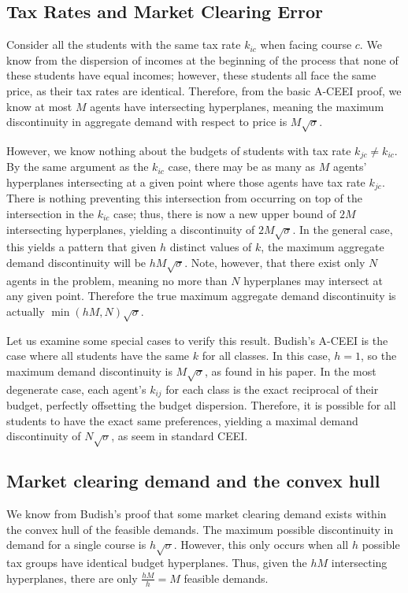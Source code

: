 \documentclass{article}
\begin{document}
\subsection{Tax Rates and Market Clearing Error}

Consider all the students with the same tax rate $k_{ic}$ when facing course $c$. We know from the dispersion of incomes at the beginning of the process that none of these students have equal incomes; however, these students all face the same price, as their tax rates are identical. Therefore, from the basic A-CEEI proof, we know at most $M$ agents have intersecting hyperplanes, meaning the maximum discontinuity in aggregate demand with respect to price is $M\sqrt{\sigma}$. 

However, we know nothing about the budgets of students with tax rate $k_{jc} \neq k_{ic}$. By the same argument as the $k_{ic}$ case, there may be as many as $M$ agents' hyperplanes intersecting at a given point where those agents have tax rate $k_{jc}$. There is nothing preventing this intersection from occurring on top of the intersection in the $k_{ic}$ case; thus, there is now a new upper bound of $2M$ intersecting hyperplanes, yielding a discontinuity of $2M\sqrt{\sigma}$. In the general case, this yields a pattern that given $h$ distinct values of $k$, the maximum aggregate demand discontinuity will be $hM\sqrt{\sigma}$. Note, however, that there exist only $N$ agents in the problem, meaning no more than $N$ hyperplanes may intersect at any given point. Therefore the true maximum aggregate demand discontinuity is actually $\min(hM, N)\sqrt{\sigma}$.

Let us examine some special cases to verify this result. Budish's A-CEEI is the case where all students have the same $k$ for all classes. In this case, $h = 1$, so the maximum demand discontinuity is $M\sqrt{\sigma}$, as found in his paper. In the most degenerate case, each agent's $k_{ij}$ for each class is the exact reciprocal of their budget, perfectly offsetting the budget dispersion. Therefore, it is possible for all students to have the exact same preferences, yielding a maximal demand discontinuity of $N\sqrt{\sigma}$, as seem in standard CEEI. 

\subsection{Market clearing demand and the convex hull}

We know from Budish's proof that some market clearing demand exists within the convex hull of the feasible demands. The maximum possible discontinuity in demand for a single course is $h\sqrt{\sigma}$. However, this only occurs when all $h$ possible tax groups have identical budget hyperplanes. Thus, given the $hM$ intersecting hyperplanes, there are only $\frac{hM}{h} = M$ feasible demands. 
\end{document}
